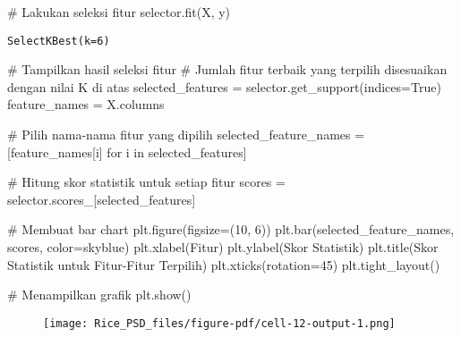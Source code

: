 \documentclass[
  letterpaper,
]{krantz}
\makeatletter
\newenvironment{Shaded}{\begin{snugshade}}{\end{snugshade}}
\newcommand{\CommentTok}[1]{\textcolor[rgb]{0.37,0.37,0.37}{#1}}
\newcommand{\ControlFlowTok}[1]{\textcolor[rgb]{0.00,0.23,0.31}{#1}}
\newcommand{\DecValTok}[1]{\textcolor[rgb]{0.68,0.00,0.00}{#1}}
\newcommand{\KeywordTok}[1]{\textcolor[rgb]{0.00,0.23,0.31}{#1}}
\newcommand{\NormalTok}[1]{\textcolor[rgb]{0.00,0.23,0.31}{#1}}
\newcommand{\OperatorTok}[1]{\textcolor[rgb]{0.37,0.37,0.37}{#1}}
\newcommand{\StringTok}[1]{\textcolor[rgb]{0.13,0.47,0.30}{#1}}
\newcommand{\VariableTok}[1]{\textcolor[rgb]{0.07,0.07,0.07}{#1}}
\newenvironment{kframe}{%
\medskip{}
\setlength{\fboxsep}{.8em}
 \def\at@end@of@kframe{}%
 \ifinner\ifhmode%
  \def\at@end@of@kframe{\end{minipage}}%
  \begin{minipage}{\columnwidth}%
 \fi\fi%
 \def\FrameCommand##1{\hskip\@totalleftmargin \hskip-\fboxsep
 \colorbox{shadecolor}{##1}\hskip-\fboxsep
     \hskip-\linewidth \hskip-\@totalleftmargin \hskip\columnwidth}%
 \MakeFramed {\advance\hsize-\width
   \@totalleftmargin\z@ \linewidth\hsize
   \@setminipage}}%
 {\par\unskip\endMakeFramed%
 \at@end@of@kframe}
\renewenvironment{Shaded}{\begin{kframe}}{\end{kframe}}
\makeatother
\begin{document}
\begin{Shaded}
\begin{Highlighting}[]
\CommentTok{\# Lakukan seleksi fitur}
\NormalTok{selector.fit(X, y)}
\end{Highlighting}
\end{Shaded}

\begin{verbatim}
SelectKBest(k=6)
\end{verbatim}

\begin{Shaded}
\begin{Highlighting}[]
\CommentTok{\# Tampilkan hasil seleksi fitur}
\CommentTok{\# Jumlah fitur terbaik yang terpilih disesuaikan dengan nilai K di atas}
\NormalTok{selected\_features }\OperatorTok{=}\NormalTok{ selector.get\_support(indices}\OperatorTok{=}\VariableTok{True}\NormalTok{)}
\NormalTok{feature\_names }\OperatorTok{=}\NormalTok{ X.columns}

\CommentTok{\# Pilih nama{-}nama fitur yang dipilih}
\NormalTok{selected\_feature\_names }\OperatorTok{=}\NormalTok{ [feature\_names[i] }\ControlFlowTok{for}\NormalTok{ i }\KeywordTok{in}\NormalTok{ selected\_features]}

\CommentTok{\# Hitung skor statistik untuk setiap fitur}
\NormalTok{scores }\OperatorTok{=}\NormalTok{ selector.scores\_[selected\_features]}

\CommentTok{\# Membuat bar chart}
\NormalTok{plt.figure(figsize}\OperatorTok{=}\NormalTok{(}\DecValTok{10}\NormalTok{, }\DecValTok{6}\NormalTok{))}
\NormalTok{plt.bar(selected\_feature\_names, scores, color}\OperatorTok{=}\StringTok{\textquotesingle{}skyblue\textquotesingle{}}\NormalTok{)}
\NormalTok{plt.xlabel(}\StringTok{\textquotesingle{}Fitur\textquotesingle{}}\NormalTok{)}
\NormalTok{plt.ylabel(}\StringTok{\textquotesingle{}Skor Statistik\textquotesingle{}}\NormalTok{)}
\NormalTok{plt.title(}\StringTok{\textquotesingle{}Skor Statistik untuk Fitur{-}Fitur Terpilih\textquotesingle{}}\NormalTok{)}
\NormalTok{plt.xticks(rotation}\OperatorTok{=}\DecValTok{45}\NormalTok{)}
\NormalTok{plt.tight\_layout()}

\CommentTok{\# Menampilkan grafik}
\NormalTok{plt.show()}
\end{Highlighting}
\end{Shaded}

\begin{figure}[H]

{\centering \texttt{[image: Rice\_PSD\_files/figure-pdf/cell-12-output-1.png]}

}

\end{figure}
\end{document}
